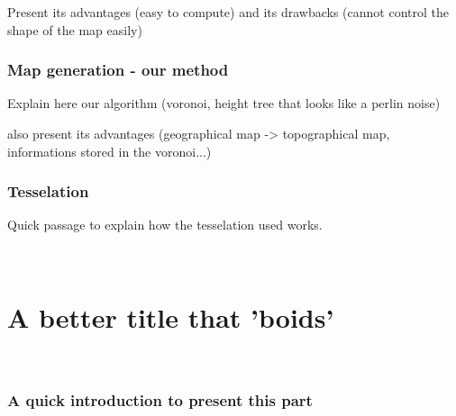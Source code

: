\documentclass[a4paper,12pt,twoside]{article}
\newcommand\skiptooddpage{%
	\checkoddpage
	\ifthenelse{\boolean{oddpage}}%
	{\null\clearpage \null \clearpage}%
	{\null\clearpage}%
}
\begin{document}
\begin{spacing}{1.3}
        Present its advantages (easy to compute)
        and its drawbacks (cannot control the shape of the map easily)

        \newpage
        \section{Map generation - our method}

        Explain here our algorithm (voronoi, height tree that looks like a perlin noise)

        also present its advantages (geographical map -> topographical map, informations stored in the voronoi...)

        \newpage
        \section{Tesselation}
        Quick passage to explain how the tesselation used works.


	\newpage
	\skiptooddpage
	~~
	\vspace{1cm}

	\part{A better title that 'boids'}
        ~~
	
	\vspace{1cm}
	\section{A quick introduction to present this part}
	

        \newpage


	\appendix
	\newpage
	
	
	
        \nocite{*}
	{\normalsize
          }
\end{spacing}
\end{document}
